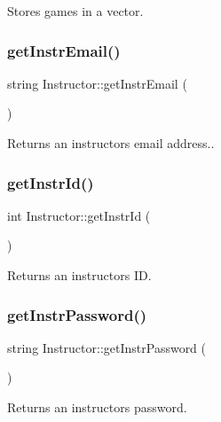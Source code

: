 Stores games in a vector. \mbox{\label{classInstructor_ac88389d0cff010143ef5a6367eee73f8}} 
\subsubsection{\texorpdfstring{get\+Instr\+Email()}{getInstrEmail()}}
{\footnotesize\ttfamily string Instructor\+::get\+Instr\+Email (\begin{DoxyParamCaption}{ }\end{DoxyParamCaption})}

Returns an instructor\textquotesingle{}s email address.. \mbox{\label{classInstructor_a7f9c4b2b1e3da3ca45d78a9f11a68fc0}} 
\subsubsection{\texorpdfstring{get\+Instr\+Id()}{getInstrId()}}
{\footnotesize\ttfamily int Instructor\+::get\+Instr\+Id (\begin{DoxyParamCaption}{ }\end{DoxyParamCaption})}

Returns an instructor\textquotesingle{}s ID. \mbox{\label{classInstructor_a19a158a811281d5ad8b3c4850a94556d}} 
\subsubsection{\texorpdfstring{get\+Instr\+Password()}{getInstrPassword()}}
{\footnotesize\ttfamily string Instructor\+::get\+Instr\+Password (\begin{DoxyParamCaption}{ }\end{DoxyParamCaption})}

Returns an instructor\textquotesingle{}s password. \mbox{\label{classInstructor_aa55caf448d54b03de5dd649260a20d5f}} 
